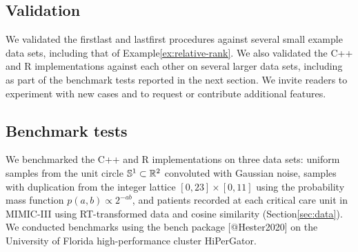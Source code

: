 \documentclass[
]{article}
\begin{document}
\hypertarget{validation}{%
\subsection{Validation}\label{validation}}

We validated the firstlast and lastfirst procedures against several
small example data sets, including that of
Example\nbs\ref{ex:relative-rank}. We also validated the C++ and R
implementations against each other on several larger data sets,
including as part of the benchmark tests reported in the next section.
We invite readers to experiment with new cases and to request or
contribute additional features.

\hypertarget{benchmark-tests}{%
\subsection{Benchmark tests}\label{benchmark-tests}}

We benchmarked the C++ and R implementations on three data sets: uniform
samples from the unit circle \(\mathbb{S}^1\subset\mathbb{R}^2\) convoluted with
Gaussian noise, samples with duplication from the integer lattice
\([0,23]\times[0,11]\) using the probability mass function
\(p(a,b) \propto 2^{-ab}\), and patients recorded at each critical care
unit in MIMIC-III using RT-transformed data and cosine similarity
(Section\nbs\ref{sec:data}). We conducted benchmarks using the bench
package {[}@Hester2020{]} on the University of Florida high-performance
cluster HiPerGator.
\end{document}
